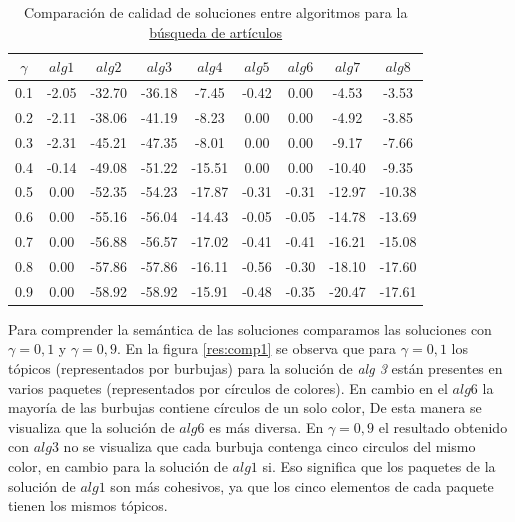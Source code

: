 \begin{table}[H]
\begin{center}
\begin{tabular}{|c|c|c|c|c|c|c|c|c|}
\hline
$\gamma$&$alg1$&$alg2$&$alg3$&$alg4$&$alg5$&$alg6$&$alg7$&$alg8$ \\ \hline
0.1 & -2.05 & -32.70 & -36.18 & -7.45 & -0.42 & 0.00 & -4.53 & -3.53 \\
0.2 & -2.11 & -38.06 & -41.19 & -8.23 & 0.00 & 0.00 & -4.92 & -3.85 \\
0.3 & -2.31 & -45.21 & -47.35 & -8.01 & 0.00 & 0.00 & -9.17 & -7.66 \\
0.4 & -0.14 & -49.08 & -51.22 & -15.51 & 0.00 & 0.00 & -10.40 & -9.35 \\
0.5 & 0.00 & -52.35 & -54.23 & -17.87 & -0.31 & -0.31 & -12.97 & -10.38 \\
0.6 & 0.00 & -55.16 & -56.04 & -14.43 & -0.05 & -0.05 & -14.78 & -13.69 \\
0.7 & 0.00 & -56.88 & -56.57 & -17.02 & -0.41 & -0.41 & -16.21 & -15.08 \\
0.8 & 0.00 & -57.86 & -57.86 & -16.11 & -0.56 & -0.30 & -18.10 & -17.60 \\
0.9 & 0.00 & -58.92 & -58.92 & -15.91 & -0.48 & -0.35 & -20.47 & -17.61 \\ \hline 
\end{tabular}
\caption{Comparación de calidad de soluciones entre algoritmos para la \hyperref[busqueda:articulos]{búsqueda de artículos}} 
\label{tabla:comp1}
\end{center}
\end{table}

Para comprender la semántica de las soluciones comparamos las soluciones con $\gamma = 0,1$ y $\gamma = 0,9$. En la figura \ref{res:comp1} se observa que para $\gamma = 0,1$ los tópicos (representados por burbujas) para la solución de \textit{alg 3} están presentes en varios paquetes (representados por círculos de colores). En cambio en el $alg6$ la mayoría de las burbujas contiene círculos de un solo color, De esta manera se visualiza que la solución de $alg6$ es más diversa. En $\gamma = 0,9$ el resultado obtenido con $alg3$ no se visualiza que cada burbuja contenga cinco circulos del mismo color, en cambio para la solución de $alg1$ si. Eso significa que los paquetes de la solución de $alg1$ son más cohesivos, ya que los cinco elementos de cada paquete tienen los mismos tópicos.

